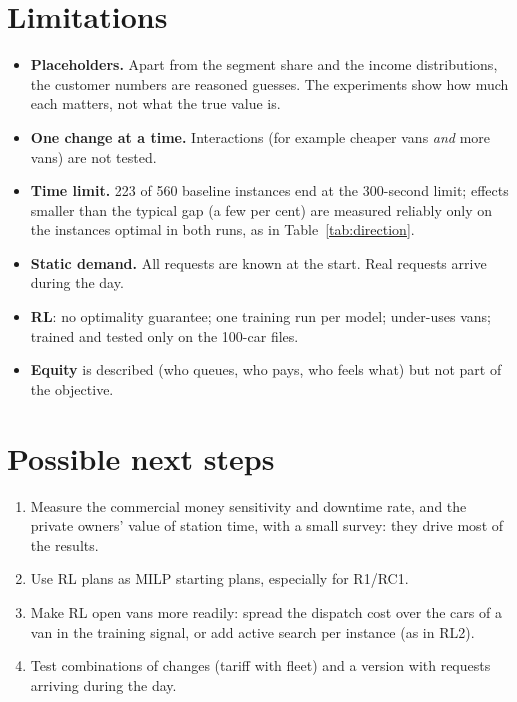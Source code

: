 \section{Limitations}

\begin{itemize}
  \item \textbf{Placeholders.} Apart from the segment share and the income distributions, the customer numbers are reasoned guesses. The experiments show how much each matters, not what the true value is.
  \item \textbf{One change at a time.} Interactions (for example cheaper vans \emph{and} more vans) are not tested.
  \item \textbf{Time limit.} 223 of 560 baseline instances end at the 300-second limit; effects smaller than the typical gap (a few per cent) are measured reliably only on the instances optimal in both runs, as in Table~\ref{tab:direction}.
  \item \textbf{Static demand.} All requests are known at the start. Real requests arrive during the day.
  \item \textbf{RL}: no optimality guarantee; one training run per model; under-uses vans; trained and tested only on the 100-car files.
  \item \textbf{Equity} is described (who queues, who pays, who feels what) but not part of the objective.
\end{itemize}

\section{Possible next steps}
\begin{enumerate}
  \item Measure the commercial money sensitivity and downtime rate, and the private owners' value of station time, with a small survey: they drive most of the results.
  \item Use RL plans as MILP starting plans, especially for R1/RC1.
  \item Make RL open vans more readily: spread the dispatch cost over the cars of a van in the training signal, or add active search per instance (as in RL2).
  \item Test combinations of changes (tariff with fleet) and a version with requests arriving during the day.
\end{enumerate}


